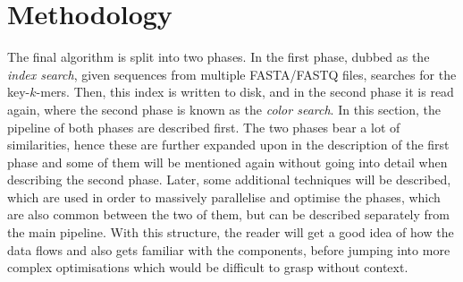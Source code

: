 \chapter{Methodology}\label{ch:Methodology}

The final algorithm is split into two phases.
In the first phase, dubbed as the \textit{index search}, given sequences from multiple FASTA/FASTQ files, searches for the key-$k$-mers.
Then, this index is written to disk, and in the second phase it is read again, where the second phase is known as the \textit{color search}.
In this section, the pipeline of both phases are described first.
The two phases bear a lot of similarities, hence these are further expanded upon in the description of the first phase and some of them will be mentioned again without going into detail when describing the second phase.
Later, some additional techniques will be described, which are used in order to massively parallelise and optimise the phases, which are also common between the two of them, but can be described separately from the main pipeline.
With this structure, the reader will get a good idea of how the data flows and also gets familiar with the components, before jumping into more complex optimisations which would be difficult to grasp without context.




